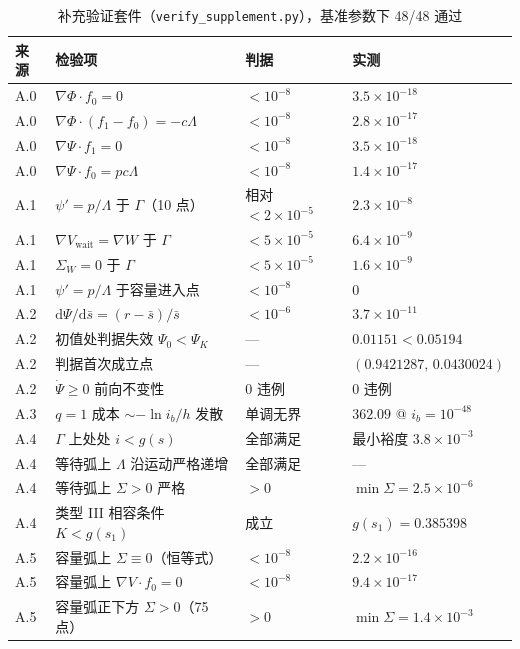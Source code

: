 \begin{table}[htbp]
\centering
\caption{补充验证套件（\texttt{verify\_supplement.py}），基准参数下 48/48 通过}
\label{tab:supplement-checks}
\small
\begin{tabular}{@{}llll@{}}
\toprule
来源 & 检验项 & 判据 & 实测\\
\midrule
A.0 & $\nabla\Phi\cdot f_0=0$ & $<10^{-8}$ & $3.5\times10^{-18}$\\
A.0 & $\nabla\Phi\cdot(f_1-f_0)=-c\Lambda$ & $<10^{-8}$ & $2.8\times10^{-17}$\\
A.0 & $\nabla\Psi\cdot f_1=0$ & $<10^{-8}$ & $3.5\times10^{-18}$\\
A.0 & $\nabla\Psi\cdot f_0=pc\Lambda$ & $<10^{-8}$ & $1.4\times10^{-17}$\\
A.1 & $\psi'=p/\Lambda$ 于 $\Gamma$（10 点） & 相对 $<2\times10^{-5}$ & $2.3\times10^{-8}$\\
A.1 & $\nabla V_{\mathrm{wait}}=\nabla W$ 于 $\Gamma$ & $<5\times10^{-5}$ & $6.4\times10^{-9}$\\
A.1 & $\Sigma_W=0$ 于 $\Gamma$ & $<5\times10^{-5}$ & $1.6\times10^{-9}$\\
A.1 & $\psi'=p/\Lambda$ 于容量进入点 & $<10^{-8}$ & $0$\\
A.2 & $\mathrm{d}\Psi/\mathrm{d}\bar s=(r-\bar s)/\bar s$ & $<10^{-6}$ & $3.7\times10^{-11}$\\
A.2 & 初值处判据失效 $\Psi_0<\Psi_K$ & --- & $0.01151<0.05194$\\
A.2 & 判据首次成立点 & --- & $(0.9421287,\,0.0430024)$\\
A.2 & $\dot\Psi\ge0$ 前向不变性 & 0 违例 & 0 违例\\
A.3 & $q=1$ 成本 $\sim-\ln i_b/h$ 发散 & 单调无界 & $362.09$ @ $i_b=10^{-48}$\\
A.4 & $\Gamma$ 上处处 $i<g(s)$ & 全部满足 & 最小裕度 $3.8\times10^{-3}$\\
A.4 & 等待弧上 $\Lambda$ 沿运动严格递增 & 全部满足 & ---\\
A.4 & 等待弧上 $\Sigma>0$ 严格 & $>0$ & $\min\Sigma=2.5\times10^{-6}$\\
A.4 & 类型 III 相容条件 $K<g(s_1)$ & 成立 & $g(s_1)=0.385398$\\
A.5 & 容量弧上 $\Sigma\equiv0$（恒等式） & $<10^{-8}$ & $2.2\times10^{-16}$\\
A.5 & 容量弧上 $\nabla V\cdot f_0=0$ & $<10^{-8}$ & $9.4\times10^{-17}$\\
A.5 & 容量弧正下方 $\Sigma>0$（75 点） & $>0$ & $\min\Sigma=1.4\times10^{-3}$\\

\end{tabular}
\end{table}
